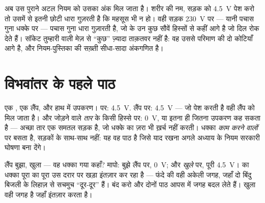 \begin{remark}[230 वोल्ट क्यों मार डालते हैं]\label{rem:g8:voltage-voltmeter:mains}
अब उस पुराने अटल नियम को उसका अंक मिल जाता है। शरीर की नम,  सड़क
को \qty{4.5}{V} पेश करो तो उसमें से इतनी छोटी धारा गुज़रती है कि
महसूस भी न हो। वही सड़क \qty{230}{V} पर --- यानी पचास गुना धक्के पर
--- पचास गुना धारा गुज़ारती है, जो  के उन कुछ सौवें हिस्सों से
कहीं आगे है जो दिल रोक देते हैं। सॉकेट तुम्हारी  वाली मेज़ से
``कुछ'' ज़्यादा ताक़तवर नहीं है: वह उससे परिमाण की दो कोटियाँ आगे है,
और नियम-पुस्तिका की सख़्ती सीधा-सादा अंकगणित है।
\end{remark}

\section{विभवांतर के पहले पाठ}

\begin{example}[एक सादे फंदे के गिर्द]\label{ex:g8:voltage-voltmeter:readings}
एक , एक लैंप, और हाथ में उपकरण।  पर: \qty{4.5}{V}. लैंप पर:
\qty{4.5}{V} ---  जो पेश करती है वही लैंप को मिल जाता है।
और जोड़ने वाले \emph{तार} के किसी हिस्से पर: \qty{0}{V}, या इतना ही
जितना उपकरण कह सकता है --- अच्छा तार एक समतल सड़क है, जो धक्के का
ज़रा भी ख़र्च नहीं करती। धक्का \emph{काम करने वालों} पर बसता है,
सड़कों के साथ-साथ नहीं: यह वह पाठ है जिसे याद रखना अगले अध्याय के नियम
सरकारी घोषणा बना देंगे।
\end{example}

\begin{example}[खुले स्विच का इक़बाल]\label{ex:g8:voltage-voltmeter:openswitch}
लैंप बुझा,  खुला --- वह धक्का गया कहाँ? मापो: बुझे लैंप पर,
\qty{0}{V}; और \emph{खुले } पर, पूरी \qty{4.5}{V}।  का
धक्का पूरा का पूरा उस दरार पर खड़ा इंतज़ार कर रहा है --- फंदे की वही
अकेली जगह, जहाँ दो बिंदु बिजली के लिहाज़ से सचमुच ``दूर-दूर'' हैं।
 बंद करो और दोनों पाठ आपस में जगह बदल लेते हैं। खुला  वही
जगह है जहाँ  इंतज़ार करता है।
\end{example}

